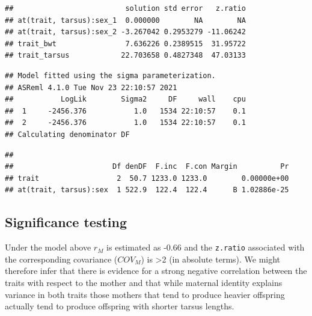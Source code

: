 \documentclass[
  12pt,
]{book}
\newenvironment{Shaded}{\begin{snugshade}}{\end{snugshade}}
\newcommand{\DataTypeTok}[1]{\textcolor[rgb]{0.13,0.29,0.53}{#1}}
\newcommand{\DecValTok}[1]{\textcolor[rgb]{0.00,0.00,0.81}{#1}}
\newcommand{\KeywordTok}[1]{\textcolor[rgb]{0.13,0.29,0.53}{\textbf{#1}}}
\newcommand{\NormalTok}[1]{#1}
\newcommand{\OperatorTok}[1]{\textcolor[rgb]{0.81,0.36,0.00}{\textbf{#1}}}
\newcommand{\OtherTok}[1]{\textcolor[rgb]{0.56,0.35,0.01}{#1}}
\newcommand{\StringTok}[1]{\textcolor[rgb]{0.31,0.60,0.02}{#1}}
\begin{document}
\begin{Shaded}
\end{Shaded}

\begin{verbatim}
##                          solution std error   z.ratio
## at(trait, tarsus):sex_1  0.000000        NA        NA
## at(trait, tarsus):sex_2 -3.267042 0.2953279 -11.06242
## trait_bwt                7.636226 0.2389515  31.95722
## trait_tarsus            22.703658 0.4827348  47.03133
\end{verbatim}

\begin{verbatim}
## Model fitted using the sigma parameterization.
## ASReml 4.1.0 Tue Nov 23 22:10:57 2021
##           LogLik        Sigma2     DF     wall    cpu
##  1     -2456.376           1.0   1534 22:10:57    0.1
##  2     -2456.376           1.0   1534 22:10:57    0.1
## Calculating denominator DF
\end{verbatim}

\begin{verbatim}
## 
##                       Df denDF  F.inc  F.con Margin          Pr
## trait                  2  50.7 1233.0 1233.0        0.00000e+00
## at(trait, tarsus):sex  1 522.9  122.4  122.4      B 1.02886e-25
\end{verbatim}

\hypertarget{significance-testing}{%
\subsection{Significance testing}\label{significance-testing}}

Under the model above \(r_M\) is estimated as -0.66 and the \texttt{z.ratio} associated with the corresponding covariance (\(COV_M\)) is \textgreater2 (in absolute terms). We might therefore infer that there is evidence for a strong negative correlation between the traits with respect to the mother and that while maternal identity explains variance in both traits those mothers that tend to produce heavier offspring actually tend to produce offspring with shorter tarsus lengths.
\end{document}
